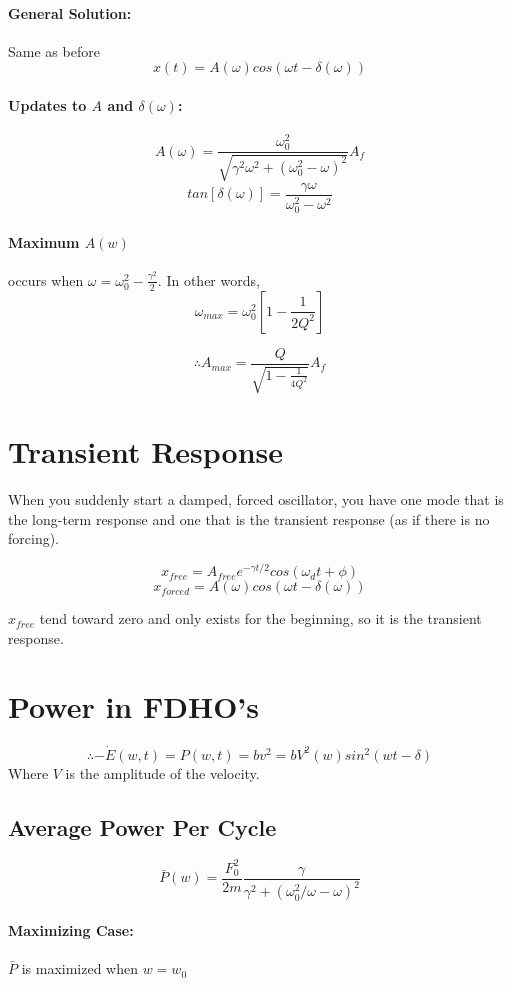 \documentclass[a4paper,12pt]{report}
\begin{document}
\paragraph{General Solution: } Same as before 
$$x(t) = A(\omega) cos(\omega t - \delta(\omega))$$

\paragraph{Updates to $A$ and $\delta(\omega)$: } 
$$A(\omega) = \frac{\omega_0^2}{\sqrt{\gamma^2\omega^2+(\omega_0^2 - \omega)^2}}A_f$$
$$tan[\delta(\omega)] = \frac{\gamma \omega}{\omega_0^2-\omega^2}$$

\paragraph{Maximum $A(w)$} occurs when $\omega = \omega_0^2 - \frac{\gamma^2}{2}$. In other words, 
$$\omega_{max} = \omega_0^2[1-\frac{1}{2Q^2}]$$

$$\therefore A_{max} = \frac{Q}{\sqrt{1-\frac{1}{4Q^2}}}A_f$$

\section{Transient Response}
When you suddenly start a damped, forced oscillator, you have one mode that is the long-term response and one 
that is the transient response (as if there is no forcing).

$$x_{free} = A_{free} e^{-\gamma t / 2}cos(\omega_d t + \phi)$$
$$x_{forced} = A(\omega) cos(\omega t - \delta(\omega))$$

$x_{free}$ tend toward zero and only exists for the beginning, so it is the transient response. 

\section{Power in FDHO's}
$$\therefore -\dot{E}(w, t) = P(w, t) = bv^2 = bV^2(w)sin^2(wt-\delta)$$
Where $V$ is the amplitude of the velocity.

\subsection{Average Power Per Cycle}
$$\bar{P}(w) = \frac{F_0^2}{2m} \frac{\gamma}{\gamma^2 + (\omega_0^2/\omega - \omega)^2}$$
\paragraph{Maximizing Case: } $\bar{P}$ is maximized when $w = w_0$
\end{document}
